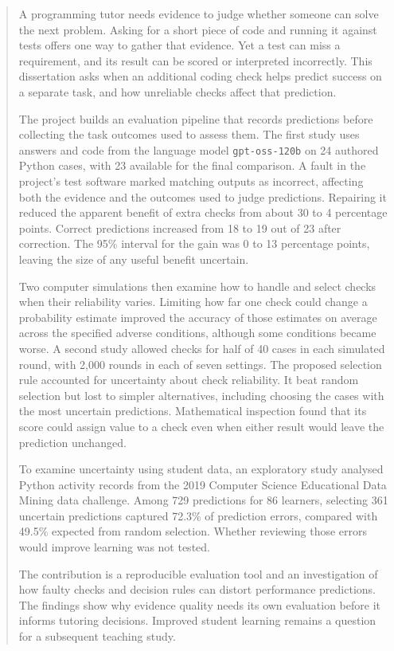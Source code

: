 \begin{abstract}
A programming tutor needs evidence to judge whether someone can solve the next problem. Asking for a short piece of code
and running it against tests offers one way to gather that evidence. Yet a test can miss a requirement, and its result can
be scored or interpreted incorrectly. This dissertation asks when an additional coding check helps predict success on a
separate task, and how unreliable checks affect that prediction.

The project builds an evaluation pipeline that records predictions before collecting the task outcomes used to assess them.
The first study uses answers and code from the language model \texttt{gpt-oss-120b} on 24 authored Python cases, with 23
available for the final comparison. A fault in the project's test software marked matching outputs as incorrect, affecting
both the evidence and the outcomes used to judge predictions. Repairing it reduced the apparent benefit of extra checks
from about 30 to 4 percentage points. Correct predictions increased from 18 to 19 out of 23 after correction.
The 95\% interval for the gain was 0 to 13 percentage points, leaving the size of any useful benefit uncertain.

Two computer simulations then examine how to handle and select checks when their reliability varies. Limiting how far one
check could change a probability estimate improved the accuracy of those estimates on average across the specified adverse conditions, although
some conditions became worse. A second study allowed checks for half of 40 cases in each simulated round, with 2,000 rounds
in each of seven settings. The proposed selection rule accounted for uncertainty about check reliability. It beat random
selection but lost to simpler alternatives, including choosing the cases with the most uncertain predictions. Mathematical
inspection found that its score could assign value to a check even when either result would leave the prediction unchanged.

To examine uncertainty using student data, an exploratory study analysed Python activity records from the 2019 Computer
Science Educational Data Mining data challenge. Among 729 predictions for 86 learners, selecting 361 uncertain predictions
captured 72.3\% of prediction errors, compared with 49.5\% expected from random selection. Whether reviewing those errors
would improve learning was not tested.

The contribution is a reproducible evaluation tool and an investigation of how faulty checks and decision rules can distort
performance predictions. The findings show why evidence quality needs its own evaluation before it informs tutoring decisions.
Improved student learning remains a question for a subsequent teaching study.
\end{abstract}
